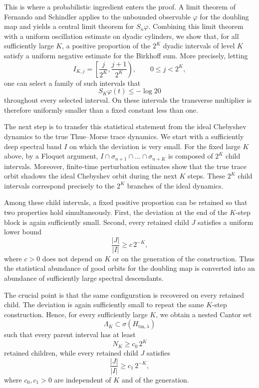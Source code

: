 \documentclass{amsart}
\theoremstyle{definition}
\begin{document}
This is where a probabilistic ingredient enters the proof. A limit
theorem of Fernando and Schindler \cite{FS26} applies to the unbounded
observable \(\varphi\) for the doubling map and yields a central limit
theorem for \(S_n\varphi\). Combining this limit theorem with a uniform
oscillation estimate on dyadic cylinders, we show that, for all
sufficiently large \(K\), a positive proportion of the \(2^K\) dyadic
intervals of level \(K\) satisfy a uniform negative estimate for the
Birkhoff sum. More precisely, letting
\[
    I_{K,j}
    =
    \left[
        \frac{j}{2^K},
        \frac{j+1}{2^K}
    \right),
    \qquad
    0\leq j<2^K,
\]
one can select a family of such intervals that
\[
    S_K\varphi(t)\leq-\log20
\]
throughout every selected interval. On these intervals the transverse
multiplier is therefore uniformly smaller than a fixed constant less
than one.

The next step is to transfer this statistical statement from the ideal
Chebyshev dynamics to the true Thue--Morse trace dynamics. 
We start with a sufficiently deep spectral band \(I\) on which the deviation is very small. 
For the fixed large \(K\) above, 
by a Floquet argument,  
$I\cap\sigma_{n+1}\cap ... \cap \sigma_{n+K}$ is composed of $2^K$ child intervals.
Moreover, finite-time perturbation estimates
show that the true trace orbit shadows the ideal Chebyshev orbit during
the next \(K\) steps. 
These \(2^K\) child intervals correspond precisely to the  \(2^K\) 
branches of the ideal dynamics.

Among these child intervals, a fixed positive proportion can be retained
so that two properties hold simultaneously. First, the deviation at
the end of the \(K\)-step block is again sufficiently small. Second,
every retained child \(J\) satisfies a uniform lower bound
\[
    \frac{|J|}{|I|}
    \geq c\,2^{-K},
\]
where \(c>0\) does not depend on \(K\) or on the generation of the
construction. Thus the statistical abundance of good orbits for the
doubling map is converted into an abundance of sufficiently large
spectral descendants.

The crucial point is that the same configuration is recovered on every retained child. 
The deviation is again sufficiently small to repeat the same \(K\)-step construction. 
Hence, for every sufficiently large \(K\), we obtain a nested Cantor set
\[
    \Lambda_K
    \subset
    \sigma(H_{\mathrm{tm},\lambda})
\]
such that every parent interval has at least
\[
    N_K\geq c_0\,2^K
\]
retained children, while every retained child \(J\) satisfies
\[
    \frac{|J|}{|I|}
    \geq c_1\,2^{-K},
\]
where \(c_0,c_1>0\) are independent of \(K\) and of the generation.
\end{document}
